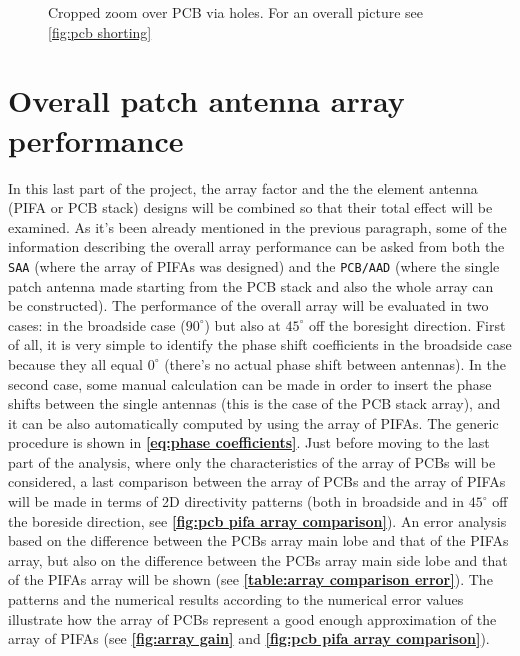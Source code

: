 \documentclass[10 pt,a4paper,twocolumn]{article}
\begin{document}
{\begin{figure}[bt!]
		\def\svgwidth{\linewidth}
		\tiny{}
	\caption{Cropped zoom over PCB via holes. For an overall picture see \cref{fig:pcb shorting}}
	\label{fig:pcb shorting zoom}
\end{figure}






\section*{Overall patch antenna array performance}
In this last part of the project, the array factor and the the element antenna (PIFA or PCB stack) designs will be combined so that their total effect will be examined. As it's been already mentioned in the previous paragraph, some of the information describing the overall array performance can be asked from both the \texttt{\color{Mahogany}SAA} (where the array of PIFAs was designed) and the \texttt{\color{Mahogany}PCB/AAD} (where the single patch antenna made starting from the PCB stack and also the whole array can be constructed). The performance of the overall array will be evaluated in two cases: in the broadside case ($90^\circ$) but also at $45^\circ$ off the boresight direction. First of all, it is very simple to identify the phase shift coefficients in the broadside case because they all equal $0^\circ$ (there's no actual phase shift between antennas). In the second case, some manual calculation can be made in order to insert the phase shifts between the single antennas (this is the case of the PCB stack array), and it can be also automatically computed by using the array of PIFAs. The generic procedure is shown in \textbf{\cref{eq:phase coefficients}}. Just before moving to the last part of the analysis, where only the characteristics of the array of PCBs will be considered, a last comparison between the array of PCBs and the array of PIFAs will be made in terms of 2D directivity patterns (both in broadside and in $45^\circ$ off the boreside direction, see \textbf{\cref{fig:pcb pifa array comparison}}). An error analysis based on the difference between the PCBs array main lobe and that of the PIFAs array, but also on the difference between the PCBs array main side lobe and that of the PIFAs array will be shown (see \textbf{\cref{table:array comparison error}}). The patterns and the numerical results according to the numerical error values illustrate how the array of PCBs represent a good enough approximation of the array of PIFAs (see \textbf{\cref{fig:array gain}} and \textbf{\cref{fig:pcb pifa array comparison}}). 

}
\end{document}
